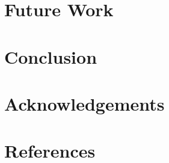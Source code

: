 \documentclass[a4paper]{article}
\begin{document}
\section{Future Work}
\blindtext{}

\section{Conclusion}
\blindtext{}

\section{Acknowledgements}
\blindtext{}

\section{References}
\blindtext{}




\end{document}
